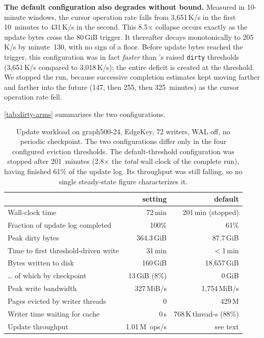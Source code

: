 \textbf{The default configuration also degrades without bound.} Measured in 10-minute windows, the cursor operation rate falls from 3{,}651\,K/s in the first 10~minutes to 431\,K/s in the second.
This 8.5$\times$ collapse occurs exactly as the update bytes cross the 80\,GiB trigger.
It thereafter decays monotonically to 205\,K/s by minute~130, with no sign of a floor. 
Before update bytes reached the trigger, this configuration was in fact \emph{faster} than \project{}'s raised \texttt{dirty} thresholds (3{,}651\,K/s compared to 3{,}018\,K/s); the entire deficit is created at the threshold.
We stopped the run, because successive completion estimates kept moving farther and farther into the future (147, then 255, then 325~minutes) as the cursor operation rate fell.

\autoref{tab:dirty-arms} summarizes the two configurations.

\begin{table}[t]
  \centering
  \setlength{\tabcolsep}{5pt}\renewcommand{\arraystretch}{1.05}
  \small
  \begin{tabular}{l rr}
  \toprule
   & \project{} setting & \wt{} default \\
  \midrule
  Wall-clock time                  & 72\,min   & 201\,min (stopped) \\
  Fraction of update log completed & 100\%     & 61\% \\
  Peak dirty bytes                & 364.3\,GiB & 87.7\,GiB \\
  Time to first threshold-driven write & 31\,min & ${<}$1\,min \\
  Bytes written to disk           & 160\,GiB   & 18{,}657\,GiB \\
  \dots{} of which by checkpoint  & 13\,GiB (8\%) & 0\,GiB \\
  Peak write bandwidth            & 327\,MiB/s & 1{,}754\,MiB/s \\
  Pages evicted by writer threads & 0          & 429\,M \\
  Writer time waiting for cache   & 0\,s       & 768\,K\,thread-s (88\%) \\
  Update throughput               & 1.01\,M~ops/s & see text \\
  \bottomrule
  \end{tabular}
  \caption{Update workload on graph500-24, EdgeKey, 72 writers, WAL off, no periodic checkpoint.
  The two configurations differ only in the four configured eviction thresholds.
  The default-threshold configuration was stopped after 201~minutes (2.8$\times$ the \emph{total} wall clock of the complete \project{} run), having finished 61\% of the update log.
  Its throughput was still falling, so no single steady-state figure characterizes it.}
  \label{tab:dirty-arms}
\end{table}

